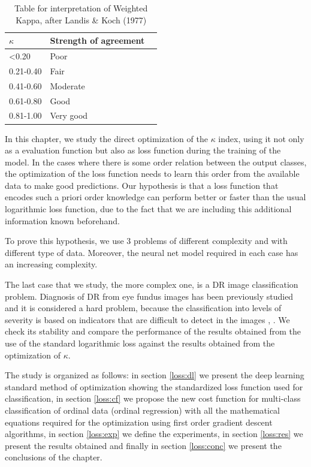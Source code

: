 \begin{table}
	\centering
	\begin{tabular}{llr}
		\hline
		$\kappa$    & Strength of agreement \\
		\hline
		<0.20 		& Poor \\
		0.21-0.40 	& Fair \\
		0.41-0.60 	& Moderate \\
		0.61-0.80 	& Good \\
		0.81-1.00 	& Very good \\
		\hline
	\end{tabular}
	\caption[Interpretation of Weighted Kappa]{Table for interpretation of Weighted Kappa, after Landis \& Koch (1977)}
	\label{loss:tab:kappa_int}	
\end{table}

In this chapter, we study the direct optimization of the $\kappa$ index, using it not only as a evaluation function but also as loss function during the training of the model. In the cases where there is some order relation between the output classes, the optimization of the loss function needs to learn this order from the available data to make good predictions. Our hypothesis is that a loss function that encodes such a priori order knowledge can perform better or faster than the usual logarithmic loss function, due to the fact that we are including this additional information known beforehand. 

To prove this hypothesis, we use 3 problems of different complexity and with  different type of data. Moreover, the neural net model required in each case has an increasing complexity.

The last case that we study, the more complex one, is a DR image classification problem. Diagnosis of DR from eye fundus images has been previously studied and it is considered a hard problem, because the classification into levels of severity is based on indicators that are difficult to detect in the images \citep{DBLP:conf/ccia/TorreVP16}, \citep{DBLP:conf/ccia/Escorcia-Gutierrez16}. 
We check its stability and compare the performance of the results obtained from the use of the standard logarithmic loss against the results obtained from the optimization of $\kappa$. 

The study is organized as follows: in section \ref{loss:dl} we present the deep learning standard method of optimization showing the standardized loss function used for classification, in section \ref{loss:cf} we propose the new cost function for multi-class classification of ordinal data (ordinal regression) with all the mathematical equations required for the optimization using first order gradient descent algorithms, in section \ref{loss:exp} we define the experiments, in section \ref{loss:res} we present the results obtained and finally in section \ref{loss:conc} we present the conclusions of the chapter.

